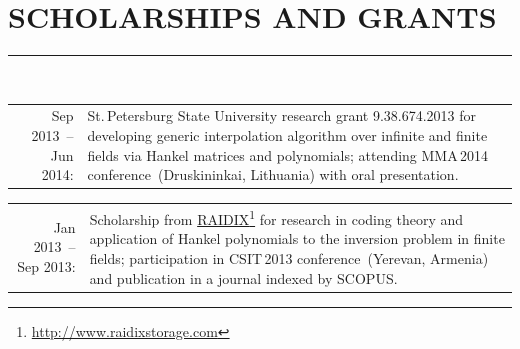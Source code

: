\documentclass[a4paper,oneside,12pt]{article}
\newcommand{\cvpart}[1]{%
\vspace{-0.9em}%
\section*{\Large\bfseries\MakeTextUppercase{#1}}%
\vspace{-1.7em}%
\rule{\linewidth}{0.3em}\\[-0.8em]%
}
\begin{document}
\cvpart{Scholarships and Grants}

\begin{tabularx}{\linewidth}{rX}
Sep 2013~-- Jun 2014:& St.\,Petersburg State University research grant 9.38.674.2013 for developing generic interpolation algorithm over infinite and finite fields via Hankel matrices and polynomials; attending MMA\,2014 con\-fe\-ren\-ce~(Druskininkai, Lithuania) with oral presentation.
\end{tabularx}

\begin{tabularx}{\linewidth}{rX}
Jan 2013~-- Sep 2013:& Scholarship from \href{http://www.raidixstorage.com}{RAIDIX}\footnote{\url{http://www.raidixstorage.com}} for research in coding theory and application of Hankel polynomials to the inversion problem in finite fields; participation in CSIT\,2013 conference~(Yerevan, Armenia) and publication in a journal indexed by SCOPUS.
\end{tabularx}
\end{document}
